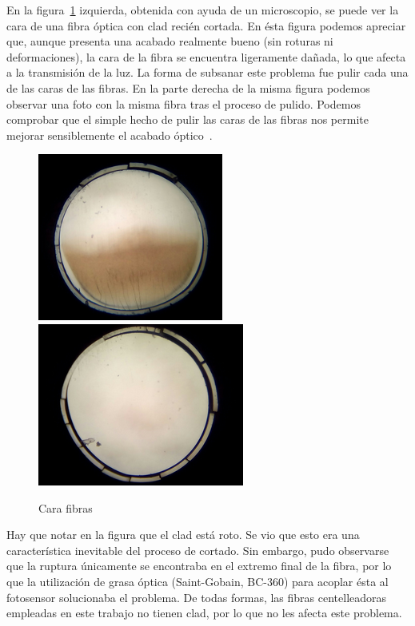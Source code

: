 En la figura~\ref{Pulido} izquierda, obtenida  con ayuda de un microscopio, se puede ver  la cara de una fibra óptica con clad recién cortada. En ésta  figura podemos apreciar que, aunque presenta una acabado realmente bueno (sin roturas ni deformaciones), la cara de la fibra se encuentra ligeramente dañada,  lo que afecta a la transmisión de la luz. La forma de subsanar este problema fue pulir cada una de las caras de las fibras. En la parte derecha de la misma figura podemos observar una foto con la misma fibra tras el proceso de pulido. Podemos comprobar que el simple hecho de pulir las caras de las fibras nos permite mejorar sensiblemente el  acabado óptico~\cite{Alberto, manual}.
\begin{figure}[htb]
\centering
{
\includegraphics[scale=0.6]{SinPulir.png} 
}
{
\includegraphics[scale=0.6]{Pulida.png} 
}
\caption{Cara fibras\label{Pulido}}
\end{figure} 
Hay que notar en la figura que el clad está roto. Se vio que esto era una característica inevitable del proceso de cortado. Sin embargo, pudo observarse que la ruptura únicamente se encontraba en el extremo final de la fibra, por lo que  la utilización de grasa óptica  (Saint-Gobain, BC-360) para acoplar ésta al fotosensor solucionaba el problema.  De todas formas, las fibras centelleadoras empleadas en este trabajo no tienen clad, por lo que no les afecta este problema. 

